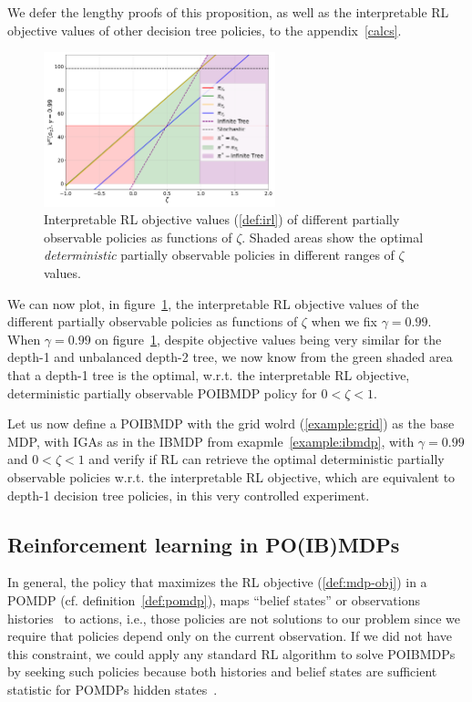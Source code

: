 We defer the lengthy proofs of this proposition, as well as the interpretable RL objective values of other decision tree policies, to the appendix~\ref{calcs}.

\begin{figure}
    \centering
    \includegraphics[width=0.6\textwidth]{images/images_part1/objective_values_plot.pdf}
    \caption{Interpretable RL objective values (\ref{def:irl}) of different partially observable policies as functions of $\zeta$. Shaded areas show the optimal \textit{deterministic} partially observable policies in different ranges of $\zeta$ values.}\label{fig:objectives}
\end{figure}

We can now plot, in figure~\ref{fig:objectives}, the interpretable RL objective values of the different partially observable policies as functions of $\zeta$ when we fix $\gamma=0.99$. 
When $\gamma=0.99$ on figure~\ref{fig:objectives}, despite objective values being very similar for the depth-1 and unbalanced depth-2 tree, we now know from the green shaded area that a depth-1 tree is the optimal, w.r.t. the interpretable RL objective, deterministic partially observable POIBMDP policy for $0< \zeta < 1$.

Let us now define a POIBMDP with the grid wolrd (\ref{example:grid}) as the base MDP, with IGAs as in the IBMDP from exapmle~\ref{example:ibmdp}, with $\gamma=0.99$ and $0<\zeta<1$ and verify if RL can retrieve the optimal deterministic partially observable policies w.r.t. the interpretable RL objective, which are equivalent to depth-1 decision tree policies, in this very controlled experiment.

\subsection{Reinforcement learning in PO(IB)MDPs}

In general, the policy that maximizes the RL objective (\ref{def:mdp-obj}) in a POMDP (cf. definition~\ref{def:pomdp}), maps ``belief states'' or observations histories~\cite{chap2} to actions, i.e., those policies are not solutions to our problem since we require that policies depend only on the current observation.
If we did not have this constraint, we could apply any standard RL algorithm to solve POIBMDPs by seeking such policies because both histories and belief states are sufficient statistic for POMDPs hidden states~\cite{chap2,lambrechts2025informed}.

